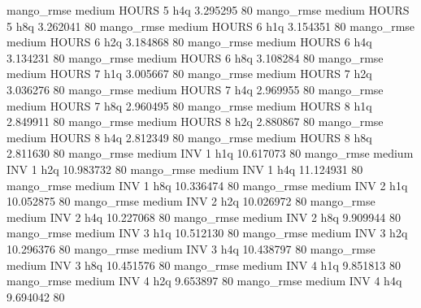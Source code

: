        mango_rmse     medium    HOURS                 5                  h4q  3.295295 80
       mango_rmse     medium    HOURS                 5                  h8q  3.262041 80
       mango_rmse     medium    HOURS                 6                  h1q  3.154351 80
       mango_rmse     medium    HOURS                 6                  h2q  3.184868 80
       mango_rmse     medium    HOURS                 6                  h4q  3.134231 80
       mango_rmse     medium    HOURS                 6                  h8q  3.108284 80
       mango_rmse     medium    HOURS                 7                  h1q  3.005667 80
       mango_rmse     medium    HOURS                 7                  h2q  3.036276 80
       mango_rmse     medium    HOURS                 7                  h4q  2.969955 80
       mango_rmse     medium    HOURS                 7                  h8q  2.960495 80
       mango_rmse     medium    HOURS                 8                  h1q  2.849911 80
       mango_rmse     medium    HOURS                 8                  h2q  2.880867 80
       mango_rmse     medium    HOURS                 8                  h4q  2.812349 80
       mango_rmse     medium    HOURS                 8                  h8q  2.811630 80
       mango_rmse     medium      INV                 1                  h1q 10.617073 80
       mango_rmse     medium      INV                 1                  h2q 10.983732 80
       mango_rmse     medium      INV                 1                  h4q 11.124931 80
       mango_rmse     medium      INV                 1                  h8q 10.336474 80
       mango_rmse     medium      INV                 2                  h1q 10.052875 80
       mango_rmse     medium      INV                 2                  h2q 10.026972 80
       mango_rmse     medium      INV                 2                  h4q 10.227068 80
       mango_rmse     medium      INV                 2                  h8q  9.909944 80
       mango_rmse     medium      INV                 3                  h1q 10.512130 80
       mango_rmse     medium      INV                 3                  h2q 10.296376 80
       mango_rmse     medium      INV                 3                  h4q 10.438797 80
       mango_rmse     medium      INV                 3                  h8q 10.451576 80
       mango_rmse     medium      INV                 4                  h1q  9.851813 80
       mango_rmse     medium      INV                 4                  h2q  9.653897 80
       mango_rmse     medium      INV                 4                  h4q  9.694042 80
